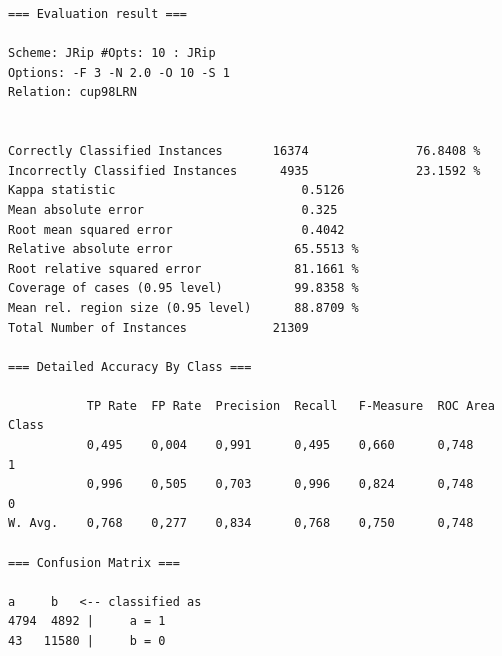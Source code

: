 \vspace{0.1cm}
\begin{mdframed}[frametitle=JRip con 10 passate successive di ottimizzazione]
\begin{verbatim}
=== Evaluation result ===

Scheme: JRip #Opts: 10 : JRip
Options: -F 3 -N 2.0 -O 10 -S 1
Relation: cup98LRN


Correctly Classified Instances       16374               76.8408 %
Incorrectly Classified Instances      4935               23.1592 %
Kappa statistic                          0.5126
Mean absolute error                      0.325 
Root mean squared error                  0.4042
Relative absolute error                 65.5513 %
Root relative squared error             81.1661 %
Coverage of cases (0.95 level)          99.8358 %
Mean rel. region size (0.95 level)      88.8709 %
Total Number of Instances            21309     

=== Detailed Accuracy By Class ===

           TP Rate  FP Rate  Precision  Recall   F-Measure  ROC Area  Class
           0,495    0,004    0,991      0,495    0,660      0,748     1
           0,996    0,505    0,703      0,996    0,824      0,748     0
W. Avg.    0,768    0,277    0,834      0,768    0,750      0,748          

=== Confusion Matrix ===

a     b   <-- classified as
4794  4892 |     a = 1
43   11580 |     b = 0
\end{verbatim}
\end{mdframed}

